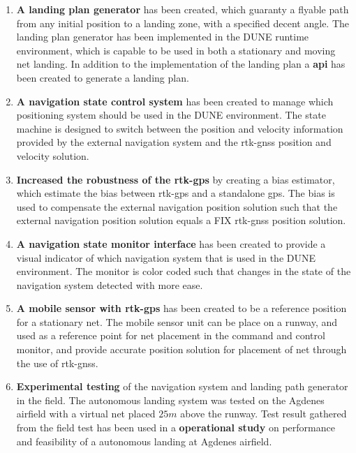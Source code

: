 \begin{enumerate}
\item \textbf{A landing plan generator} has been created, which guaranty a flyable path from any initial position to a landing zone, with a specified decent angle. The landing plan generator has been implemented in the DUNE runtime environment, which is capable to be used in both a stationary and moving net landing. In addition to the implementation of the landing plan a \textbf{\gls{api}} has been created to generate a landing plan.
\item \textbf{A navigation state control system} has been created to manage which positioning system should be used in the DUNE environment. The state machine is designed to switch between the position and velocity information provided by the external navigation system and the \gls{rtk-gnss} position and velocity solution.
\item \textbf{Increased the robustness of the \gls{rtk-gps}} by creating a bias estimator, which estimate the bias between \gls{rtk-gps} and a standalone \gls{gps}. The bias is used to compensate the external navigation position solution such that the external navigation position solution equals a FIX \gls{rtk-gnss} position solution.
\item \textbf{A navigation state monitor interface} has been created to provide a visual indicator of which navigation system that is used in the DUNE environment. The monitor is color coded such that changes in the state of the navigation system detected with more ease.
\item \textbf{A mobile sensor with \gls{rtk-gps}} has been created to be a reference position for a stationary net. The mobile sensor unit can be place on a runway, and used as a reference point for net placement in the command and control monitor, and provide accurate position solution for placement of net through the use of \gls{rtk-gnss}.
\item \textbf{Experimental testing} of the navigation system and landing path generator in the field. The autonomous landing system was tested on the Agdenes airfield with a virtual net placed $25 m$ above the runway. Test result gathered from the field test has been used in a \textbf{operational study} on performance and  feasibility of a autonomous landing at Agdenes airfield.
\end{enumerate}
